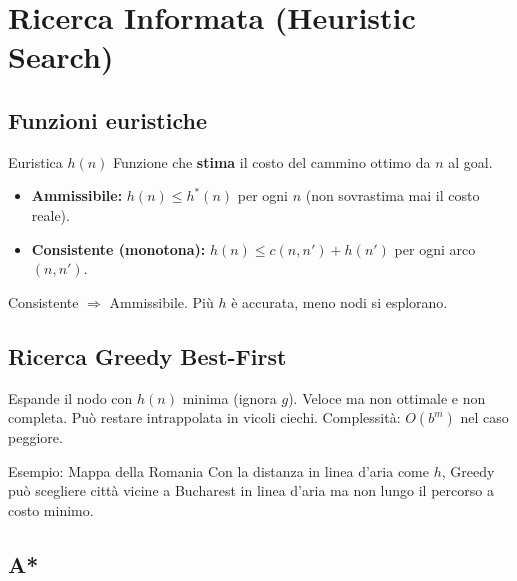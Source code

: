 \documentclass[12pt,a4paper]{article}
\begin{document}
\section{Ricerca Informata (Heuristic Search)}

\subsection{Funzioni euristiche}

\begin{defbox}{Euristica $h(n)$}
Funzione che \textbf{stima} il costo del cammino ottimo da $n$ al goal.

\begin{itemize}[noitemsep]
  \item \textbf{Ammissibile:} $h(n) \leq h^*(n)$ per ogni $n$ (non sovrastima mai il costo reale).
  \item \textbf{Consistente (monotona):} $h(n) \leq c(n,n') + h(n')$ per ogni arco $(n,n')$.
\end{itemize}
Consistente $\Rightarrow$ Ammissibile. Più $h$ è accurata, meno nodi si esplorano.
\end{defbox}

\subsection{Ricerca Greedy Best-First}

Espande il nodo con $h(n)$ minima (ignora $g$). Veloce ma non ottimale e non completa. Può restare intrappolata in vicoli ciechi. Complessità: $O(b^m)$ nel caso peggiore.

\begin{esempiobox}{Esempio: Mappa della Romania}
Con la distanza in linea d'aria come $h$, Greedy può scegliere città vicine a Bucharest in linea d'aria ma non lungo il percorso a costo minimo.
\end{esempiobox}

\subsection{A*}
\end{document}
